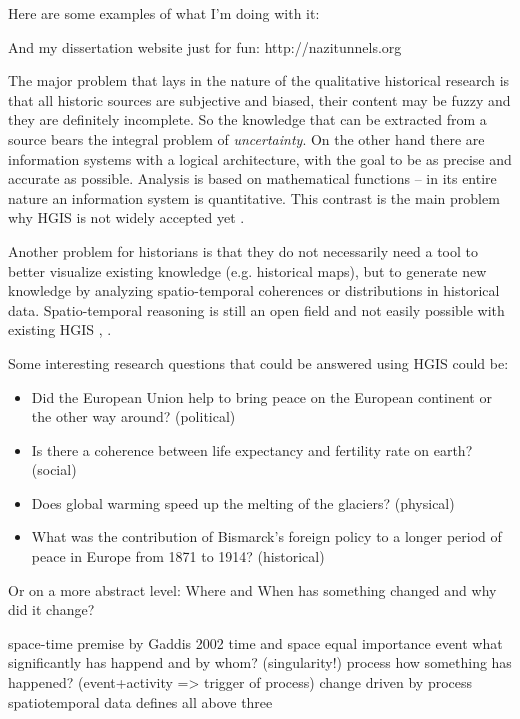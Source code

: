 Here are some examples of what I’m doing with it:

And my dissertation website just for fun: http://nazitunnels.org

The major problem that lays in the nature of the qualitative historical research is that all historic sources are subjective and biased, their content may be fuzzy and they are definitely incomplete. So the knowledge that can be extracted from a source bears the integral problem of \emph{uncertainty}. On the other hand there are information systems with a logical architecture, with the goal to be as precise and accurate as possible. Analysis is based on mathematical functions -- in its entire nature an information system is quantitative. This contrast is the main problem why HGIS is not widely accepted yet
\cite[p. 2]{knowles2008placing}.

Another problem for historians is that they do not necessarily need a tool to better visualize existing knowledge (e.g. historical maps), but to generate new knowledge by analyzing spatio-temporal coherences or distributions in historical data. Spatio-temporal reasoning is still an open field and not easily possible with existing HGIS
\cite[p. 268]{knowles2008placing}, \cite[p. xii]{gregory2014toward}.

Some interesting research questions that could be answered using HGIS could be:

\begin{itemize}
  \item Did the European Union help to bring peace on the European continent or the other way around? (political)
  \item Is there a coherence between life expectancy and fertility rate on earth? (social)
  \item Does global warming speed up the melting of the glaciers? (physical)
  \item What was the contribution of Bismarck's foreign policy to a longer period of peace in Europe from 1871 to 1914? (historical)
\end{itemize}

Or on a more abstract level: Where and When has something changed and why did it change?


space-time premise by Gaddis 2002
  time and space equal importance
  event     what significantly has happend and by whom? (singularity!)
  process   how something has happened? (event+activity => trigger of process)
  change    driven by process
  spatiotemporal data defines all above three


